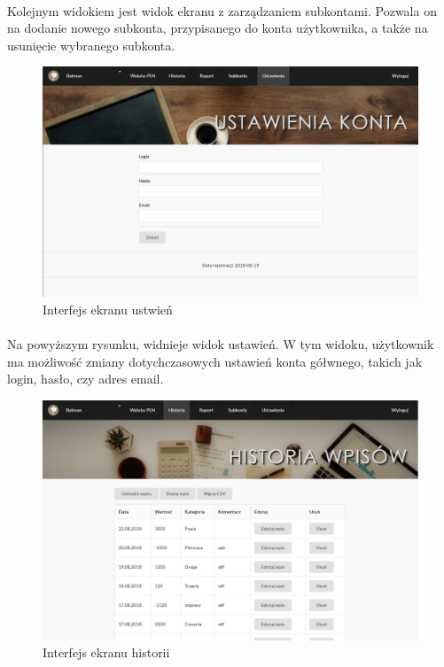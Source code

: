 \documentclass{article}
\begin{document}
\paragraph*{} Kolejnym widokiem jest widok ekranu z zarządzaniem subkontami. Pozwala on na dodanie nowego subkonta, przypisanego do konta użytkownika, a także na usunięcie wybranego subkonta.
\begin{figure}[H]
	\hspace*{-4.5cm}
	\includegraphics[scale=0.7]{assets/ust.png}
	\caption[]{Interfejs ekranu ustwień}
	\label{fig:ustawienia}
\end{figure}
\paragraph*{} Na powyższym rysunku, widnieje widok ustawień. W tym widoku, użytkownik ma możliwość zmiany dotychczasowych ustawień konta gółwnego, takich jak login, hasło, czy adres email.
\begin{figure}[H]
	\hspace*{-3cm}
	\includegraphics[scale=0.6]{assets/his.png}
	\caption[]{Interfejs ekranu historii}
	\label{fig:historia}
\end{figure}
\end{document}
